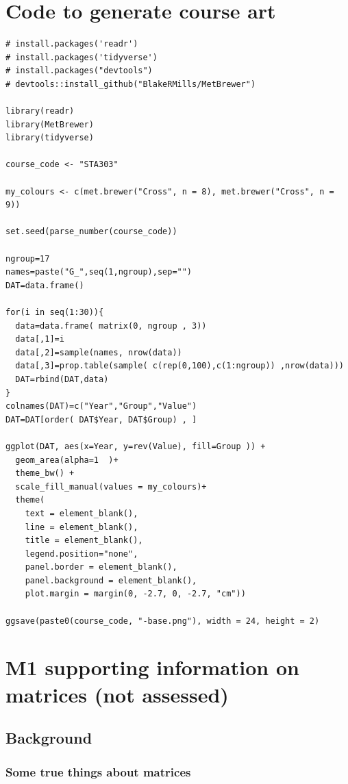 \documentclass[
]{book}
\begin{document}
\hypertarget{code-to-generate-course-art}{%
\section{Code to generate course art}\label{code-to-generate-course-art}}

\begin{verbatim}
# install.packages('readr')
# install.packages('tidyverse')
# install.packages("devtools")
# devtools::install_github("BlakeRMills/MetBrewer")

library(readr)
library(MetBrewer)
library(tidyverse)

course_code <- "STA303"

my_colours <- c(met.brewer("Cross", n = 8), met.brewer("Cross", n = 9))

set.seed(parse_number(course_code))

ngroup=17
names=paste("G_",seq(1,ngroup),sep="")
DAT=data.frame()

for(i in seq(1:30)){
  data=data.frame( matrix(0, ngroup , 3))
  data[,1]=i
  data[,2]=sample(names, nrow(data))
  data[,3]=prop.table(sample( c(rep(0,100),c(1:ngroup)) ,nrow(data)))
  DAT=rbind(DAT,data)
}
colnames(DAT)=c("Year","Group","Value")
DAT=DAT[order( DAT$Year, DAT$Group) , ]

ggplot(DAT, aes(x=Year, y=rev(Value), fill=Group )) +
  geom_area(alpha=1  )+
  theme_bw() +
  scale_fill_manual(values = my_colours)+
  theme(
    text = element_blank(),
    line = element_blank(),
    title = element_blank(),
    legend.position="none",
    panel.border = element_blank(),
    panel.background = element_blank(),
    plot.margin = margin(0, -2.7, 0, -2.7, "cm"))

ggsave(paste0(course_code, "-base.png"), width = 24, height = 2)
\end{verbatim}

\hypertarget{matrices}{%
\section{M1 supporting information on matrices (not assessed)}\label{matrices}}

\hypertarget{background}{%
\subsection{Background}\label{background}}

\hypertarget{some-true-things-about-matrices}{%
\subsubsection{Some true things about matrices}\label{some-true-things-about-matrices}}
\end{document}
